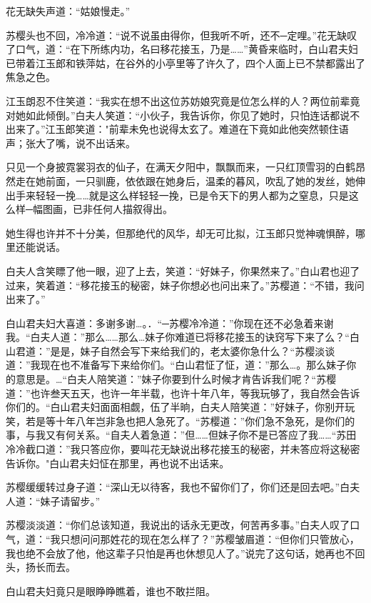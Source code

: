 \documentclass[12pt,oneside]{book}
\begin{document}
花无缺失声道：``姑娘慢走。''

苏樱头也不回，冷冷道：``说不说虽由得你，但我听不听，还不─定哩。''花无缺叹了口气，道：``在下所练内功，名曰移花接玉，乃是\ldots\ldots{}''黄昏来临时，白山君夫妇已带着江玉郎和铁萍姑，在谷外的小亭里等了许久了，四个人面上已不禁都露出了焦急之色。

江玉朗忍不住笑道：``我实在想不出这位苏妨娘究竟是位怎么样的人？两位前辈竟对她如此倾倒。''白夫人笑道：``小伙子，我告诉你，你见了她时，只怕连话都说不出来了。''江玉郎笑道："前辈未免也说得太玄了。难道在下竟如此他突然顿住语声；张大了嘴，说不出话来。

只见一个身披霓裳羽衣的仙子，在满天夕阳中，飘飘而来，一只红顶雪羽的白鹤昂然走在她前面，一只驯鹿，依依跟在她身后，温柔的暮风，吹乱了她的发丝，她伸出手来轻轻一挽\ldots\ldots 就是这么样轻轻一挽，已是令天下的男人都为之窒息，只是这么样─幅图画，已非任何人描叙得出。

她生得也许并不十分美，但那绝代的风华，却无可比拟，江玉郎只觉神魂惧醉，哪里还能说话。

白夫人含笑瞟了他一眼，迎了上去，笑道：``好妹子，你果然来了。''白山君也迎了过来，笑着道：``移花接玉的秘密，妹子你想必也问出来了。''苏樱道：``不错，我问出来了。''

白山君夫妇大喜道：多谢多谢\ldots。．``─苏樱冷冷道：''你现在还不必急着来谢我。``白夫人道：''那么\ldots\ldots 那么\ldots 妹子你难道已将移花接玉的诀窍写下来了么？``白山君道：''是是，妹子自然会写下来给我们的，老太婆你急什么？``苏樱淡谈道：''我现在也不准备写下来给你们。``白山君怔了怔，道：''那么\ldots。那么妹子你的意思是。\ldots{}``白夫人陪笑道：''妹子你要到什么时候才肯告诉我们呢？``苏樱道：''也许叁天五天，也许一年半载，也许十年八年，等我玩够了，我自然会告诉你们的。``白山君夫妇面面相觑，伍了半晌，白夫人陪笑道：''好妹子，你别开玩笑，若是等十年八年岂非急也把人急死了。``苏樱道：''你们急不急死，是你们的事，与我又有何关系。``自夫人着急道：''但\ldots\ldots 但妹子你不是已答应了我\ldots\ldots{}``苏田冷冷截口道：''我只答应你，要叫花无缺说出移花接玉的秘密，并未答应将这秘密告诉你。"白山君夫妇怔在那里，再也说不出话来。

苏樱缓缓转过身子道：``深山无以待客，我也不留你们了，你们还是回去吧。''白夫人道：``妹子请留步。''

苏樱淡淡道：``你们总该知道，我说出的话永无更改，何苦再多事。''白夫人叹了口气，道：``我只想问问那姓花的现在怎么样了？''苏樱皱眉道：``但你们只管放心，我也绝不会放了他，他这辈子只怕是再也休想见人了。''说完了这句话，她再也不回头，扬长而去。

白山君夫妇竟只是眼睁睁瞧着，谁也不敢拦阻。
\end{document}
